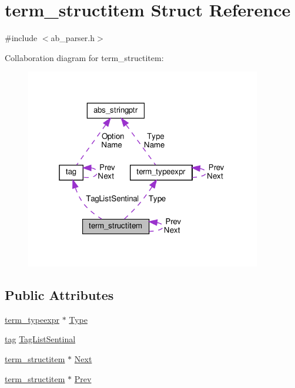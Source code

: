 \hypertarget{structterm__structitem}{}\section{term\+\_\+structitem Struct Reference}
\label{structterm__structitem}


{\ttfamily \#include $<$ab\+\_\+parser.\+h$>$}



Collaboration diagram for term\+\_\+structitem\+:\nopagebreak
\begin{figure}[H]
\begin{center}
\leavevmode
\includegraphics[width=292pt]{df/d30/structterm__structitem__coll__graph}
\end{center}
\end{figure}
\subsection*{Public Attributes}
\begin{DoxyCompactItemize}
\item 
\hyperlink{structterm__typeexpr}{term\+\_\+typeexpr} $\ast$ \hyperlink{structterm__structitem_ac2a7c2261f1714cedb33376eb440e66c}{Type}
\item 
\hyperlink{structtag}{tag} \hyperlink{structterm__structitem_a25c03f6130b24c035dadd65fbe5f0110}{Tag\+List\+Sentinal}
\item 
\hyperlink{structterm__structitem}{term\+\_\+structitem} $\ast$ \hyperlink{structterm__structitem_a92becd37fab5b7e4b326e3111c6a7c40}{Next}
\item 
\hyperlink{structterm__structitem}{term\+\_\+structitem} $\ast$ \hyperlink{structterm__structitem_a724d81ad66a76f54b153a97a8b175b7d}{Prev}
\end{DoxyCompactItemize}


